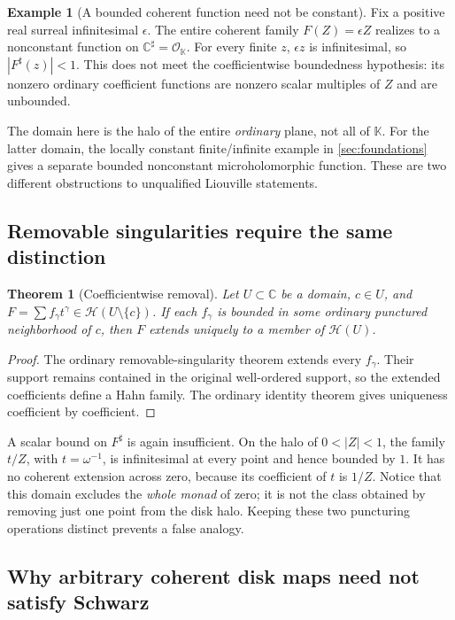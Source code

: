 \documentclass[11pt,letterpaper]{article}
\numberwithin{equation}{section}
\newtheorem{theorem}{Theorem}[section]
\theoremstyle{definition}
\newtheorem{example}[example]{Example}
\theoremstyle{remark}
\newcommand{\K}{\mathbb K}
\newcommand{\C}{\mathbb C}
\newcommand{\OO}{\mathcal O}
\newcommand{\HH}{\mathscr H}
\begin{document}
\begin{example}[A bounded coherent function need not be constant]
Fix a positive real surreal infinitesimal $\epsilon$. The entire
coherent family $F(Z)=\epsilon Z$ realizes to a nonconstant function on
$\C^\sharp=\OO_\K$. For every finite $z$, $\epsilon z$ is
infinitesimal, so $|F^\sharp(z)|<1$. This does not meet the
coefficientwise boundedness hypothesis: its nonzero ordinary coefficient
functions are nonzero scalar multiples of $Z$ and are unbounded.

The domain here is the halo of the entire \emph{ordinary} plane, not all
of $\K$. For the latter domain, the locally constant finite/infinite
example in \cref{sec:foundations} gives a separate bounded nonconstant
microholomorphic function. These are two different obstructions to
unqualified Liouville statements.
\end{example}

\subsection{Removable singularities require the same distinction}

\begin{theorem}[Coefficientwise removal]
Let $U\subset\C$ be a domain, $c\in U$, and
$F=\sum f_\gamma t^\gamma\in\HH(U\setminus\{c\})$.
If each $f_\gamma$ is bounded in some ordinary punctured neighborhood
of $c$, then $F$ extends uniquely to a member of $\HH(U)$.
\end{theorem}
\begin{proof}
The ordinary removable-singularity theorem extends every $f_\gamma$.
Their support remains contained in the original well-ordered support,
so the extended coefficients define a Hahn family. The ordinary identity
theorem gives uniqueness coefficient by coefficient.
\end{proof}

A scalar bound on $F^\sharp$ is again insufficient. On the halo of
$0<|Z|<1$, the family $t/Z$, with $t=\omega^{-1}$, is infinitesimal
at every point and hence bounded by $1$. It has no coherent extension
across zero, because its coefficient of $t$ is $1/Z$. Notice that this
domain excludes the \emph{whole monad} of zero; it is not the class
obtained by removing just one point from the disk halo. Keeping these
two puncturing operations distinct prevents a false analogy.

\subsection{Why arbitrary coherent disk maps need not satisfy Schwarz}
\end{document}
